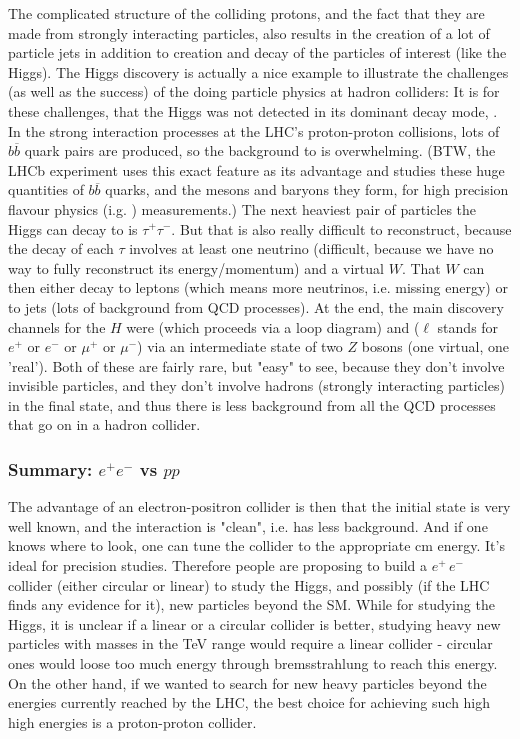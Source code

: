 The complicated structure of the colliding protons, and the fact that they are made from strongly interacting particles, also results in the creation of a lot of particle jets in addition to creation and decay of the particles of interest (like the Higgs). 
The Higgs discovery is actually a nice example to illustrate the challenges (as well as the success) of the doing particle physics at hadron colliders: 
It is for these challenges, that the Higgs was not detected in its dominant decay mode, . In the strong interaction processes at the LHC's proton-proton collisions, lots of $b\overline{b}$ quark pairs are produced, so the background to  is overwhelming. 
(BTW, the LHCb experiment uses this exact feature as its advantage and studies these huge quantities of $b\overline{b}$ quarks, and the mesons and baryons they form, for high precision flavour physics (i.g. \cpv) measurements.) 
The next heaviest pair of particles the Higgs can decay to is $\tau^+\tau^-$. But that is also really difficult to reconstruct, because the decay of each $\tau$ involves at least one neutrino (difficult, because we have no way to fully reconstruct its energy/momentum) and a virtual $W$. That $W$ can then either decay to leptons (which means more neutrinos, i.e. missing energy) or to jets (lots of background from QCD processes). 
At the end, the main discovery channels for the $H$ were  (which proceeds via a loop diagram) and  ($\ell$ stands for $e^+$ or $e^-$ or $\mu^+$ or $\mu^-$) via an intermediate state of two $Z$ bosons (one virtual, one 'real'). 
Both of these are fairly rare, but "easy" to see, because they don't involve invisible particles, and they don't involve hadrons (strongly interacting particles) in the final state, and thus there is less background from all the QCD processes that go on in a hadron collider.

\subsubsection{Summary: $e^+ e^-$ vs $pp$}
The advantage of an electron-positron collider is then that the initial state is very well known, and the interaction is "clean", i.e. has less background. And if one knows where to look, one can tune the collider to the appropriate cm energy. It's ideal for precision studies. 
Therefore people are proposing to build a $e^+\,e^-$ collider (either circular or linear) to study the Higgs, and possibly (if the LHC finds any evidence for it), new particles beyond the SM. 
While for studying the Higgs, it is unclear if a linear or a circular collider is better, studying heavy new particles with masses in the TeV range would require a linear collider - circular ones would loose too much energy through bremsstrahlung to reach this energy. On the other hand, if we wanted to search for new heavy particles beyond the energies currently reached by the LHC, the best choice for achieving such high high energies is a proton-proton collider.

